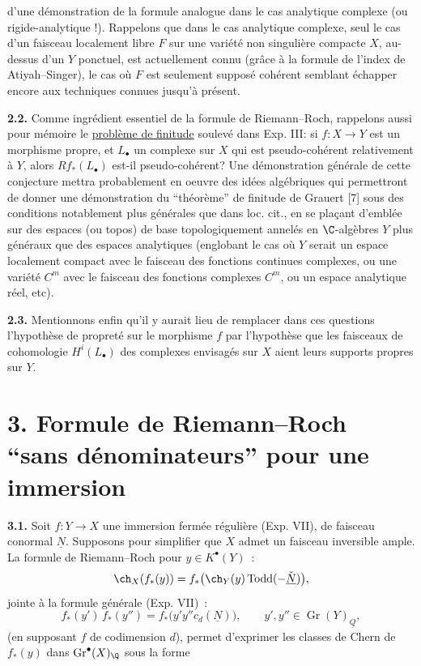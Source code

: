
d'une
démonstration de la formule analogue dans le cas analytique complexe (ou rigide-analytique !). Rappelons que dans le cas analytique complexe, seul le cas d'un faisceau localement libre $F$ sur une variété non singulière compacte $X$, au-dessus d'un $Y$ ponctuel, est actuellement connu (grâce à la formule de l'index de Atiyah--Singer), le cas où $F$ est seulement supposé cohérent semblant échapper encore aux techniques connues jusqu'à présent.

\textbf{2.2.} Comme ingrédient essentiel de la formule de Riemann--Roch, rappelons aussi pour mémoire le \uline{problème de finitude} soulevé dans Exp. III: si $f:X\to Y$ est un morphisme propre, et $L_\bullet$ un complexe sur $X$ qui est pseudo-cohérent relativement à $Y$, alors $Rf_*(L_\bullet)$ est-il pseudo-cohérent? Une démonstration générale de cette conjecture mettra probablement en oeuvre des idées algébriques qui permettront de donner une démonstration du ``théorème'' de finitude de Grauert [7] sous des conditions notablement plus générales que dans loc. cit., en se plaçant d'emblée sur des espaces (ou topos) de base topologiquement annelés en $\C$-algèbres $Y$ plus généraux que des espaces analytiques (englobant le cas où $Y$ serait un espace localement compact avec le faisceau des fonctions continues complexes, ou une variété $C^m$ avec le faisceau des fonctions complexes $C^m$, ou un espace analytique réel, etc).

\textbf{2.3.} Mentionnons enfin qu'il y aurait lieu de remplacer dans ces questions l'hypothèse de propreté sur le morphisme $f$ par l'hypothèse que les faisceaux de cohomologie $H^i(L_\bullet)$ des complexes envisagés sur $X$ aient leurs supports propres sur $Y$.

\section*{3. Formule de Riemann--Roch ``sans dénominateurs'' pour une immersion}

\textbf{3.1.} Soit $f:Y\to X$ une immersion fermée régulière (Exp. VII), de faisceau conormal $\underline N$. Supposons pour simplifier que $X$ admet un faisceau inversible ample. La formule de Riemann--Roch pour $y\in K^\bullet(Y)$~:
\[
 \ch_X(f_*(y))=f_*\bigl(\ch_Y(y)\operatorname{Todd}(-\check{\underline N})\bigr),
\]
jointe à la formule générale (Exp. VII)~:
\[
 f_*(y')\,f_*(y'')=f_*\bigl(y'y''c_d(\underline N)\bigr),\qquad y',y''\in \operatorname{Gr}(Y)_{\underline Q},
\]
(en supposant $f$ de codimension $d$), permet d'exprimer les classes de Chern de $f_*(y)$ dans $\operatorname{Gr}^\bullet(X)_\Q$ sous la forme
